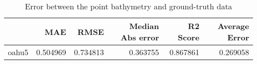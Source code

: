 \begin{table}[h!]
\caption{Error between the point bathymetry and ground-truth data}
\label{tab:oahu5_lidar_error}
\begin{tabular}{lrrrrr}
\toprule
 & MAE & RMSE & Median Abs error & R2 Score & Average Error \\
\midrule
oahu5 & 0.504969 & 0.734813 & 0.363755 & 0.867861 & 0.269058 \\
\bottomrule
\end{tabular}
\end{table}
